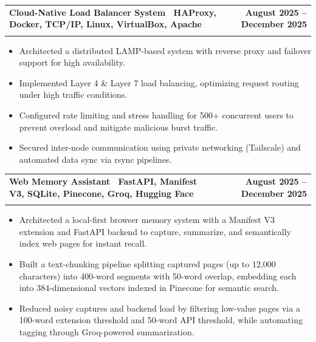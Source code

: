 \documentclass[letterpaper,11pt]{article}
\makeatletter
\newcommand{\resumeItem}[1]{\item\small{#1 \vspace{-4pt}}}  %
\newcommand{\resumeSubheading}[4]{
    \vspace{-2pt}\item
    \begin{tabular*}{1.0\textwidth}[t]{l@{\extracolsep{\fill}}r}
        \textbf{#1} & \textbf{\small #2} \\
        \textit{\small#3} & \textit{\small #4}
    \end{tabular*}\vspace{-7pt}
}
\newcommand{\resumeSubHeadingListEnd}{\end{itemize}}
\newcommand{\resumeItemListStart}{\begin{itemize}}
\newcommand{\resumeItemListEnd}{\end{itemize}\vspace{-7pt}}  %
\makeatother
\begin{document}
\resumeSubheading
{\textbf{Cloud-Native Load Balancer System} \textnormal{ \textbar\ {HAProxy, Docker, TCP/IP, Linux, VirtualBox, Apache}}}{August 2025 -- December 2025}{}{}
\vspace{-0.6cm}
\resumeItemListStart
\resumeItem{Architected a distributed LAMP-based system with reverse proxy and failover support for high availability.}
\vspace{0.15cm}
\resumeItem{Implemented Layer 4 \& Layer 7 load balancing, optimizing request routing under high traffic conditions.}
\vspace{0.15cm}
\resumeItem{Configured rate limiting and stress handling for 500+ concurrent users to prevent overload and mitigate malicious burst traffic.}
\vspace{0.15cm}
\resumeItem{Secured inter-node communication using private networking (Tailscale) and automated data sync via rsync pipelines.}
\vspace{0.15cm}
\resumeItemListEnd


\resumeSubheading
{\textbf{Web Memory Assistant} \textnormal{ \textbar\ {FastAPI, Manifest V3, SQLite, Pinecone, Groq, Hugging Face}}}{August 2025 -- December 2025}{}{}
\vspace{-0.6cm}
\resumeItemListStart
\resumeItem{Architected a local-first browser memory system with a Manifest V3 extension and FastAPI backend to capture, summarize, and semantically index web pages for instant recall.}
\vspace{0.15cm}
\resumeItem{Built a text-chunking pipeline splitting captured pages (up to 12{,}000 characters) into 400-word segments with 50-word overlap, embedding each into 384-dimensional vectors indexed in Pinecone for semantic search.}
\vspace{0.15cm}
\resumeItem{Reduced noisy captures and backend load by filtering low-value pages via a 100-word extension threshold and 50-word API threshold, while automating tagging through Groq-powered summarization.}
\vspace{0.15cm}
\resumeItemListEnd
\end{document}

